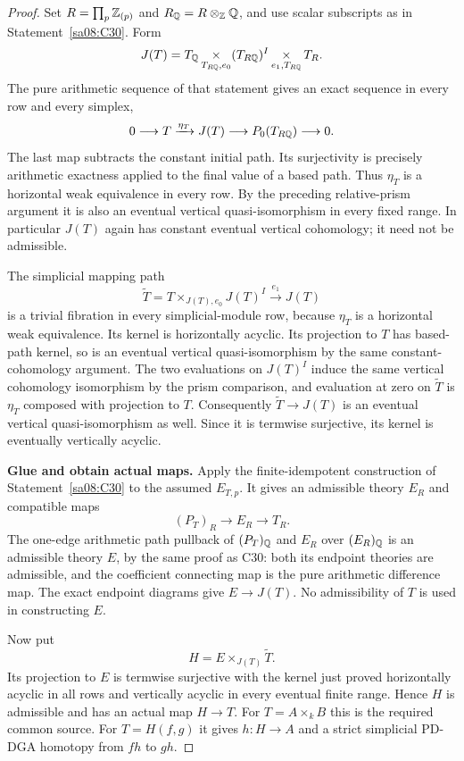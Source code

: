 \begin{proof}
Set $R=\prod_p\mathbb Z_{(p)}$ and $R_\mathbb Q=R\otimes_\mathbb Z\mathbb Q$, and use
scalar subscripts as in Statement~\ref{sa08:C30}. Form
\[
 J(T)=T_\mathbb Q\mathop{\times}_{T_{R\mathbb Q},e_0}
             (T_{R\mathbb Q})^I
           \mathop{\times}_{e_1,T_{R\mathbb Q}}T_R.
\]
The pure arithmetic sequence of that statement gives an exact
sequence in every row and every simplex,
\[
 0\longrightarrow T\xrightarrow{\eta_T}J(T)
       \longrightarrow P_0(T_{R\mathbb Q})\longrightarrow0.
\]
The last map subtracts the constant initial path. Its surjectivity
is precisely arithmetic exactness applied to the final value of a
based path. Thus $\eta_T$ is a horizontal weak equivalence in every
row. By the preceding relative-prism argument it is also an eventual
vertical quasi-isomorphism in every fixed range. In particular
$J(T)$ again has constant eventual vertical cohomology; it need not
be admissible.

The simplicial mapping path
\[
 \widetilde T=T\mathop{\times}_{J(T),e_0}J(T)^I
           \xrightarrow{e_1}J(T)
\]
is a trivial fibration in every simplicial-module row, because
$\eta_T$ is a horizontal weak equivalence. Its kernel is horizontally
acyclic. Its projection to $T$ has based-path kernel, so is an
eventual vertical quasi-isomorphism by the same constant-cohomology
argument. The two evaluations on $J(T)^I$ induce the same vertical
cohomology isomorphism by the prism comparison, and evaluation at zero
on $\widetilde T$ is $\eta_T$ composed with projection to $T$.
Consequently $\widetilde T\to J(T)$ is an eventual
vertical quasi-isomorphism as well. Since it is termwise surjective,
its kernel is eventually vertically acyclic.

\par\medskip\noindent\textbf{Glue and obtain actual maps.}
Apply the finite-idempotent construction of
Statement~\ref{sa08:C30} to the assumed $E_{T,p}$. It gives an
admissible theory $E_R$ and compatible maps
\[
 (P_T)_R\longrightarrow E_R\longrightarrow T_R.
\]
The one-edge arithmetic path pullback of $(P_T)_\mathbb Q$ and $E_R$
over $(E_R)_\mathbb Q$ is an admissible theory $E$, by the same proof as
C30: both its endpoint theories are admissible, and the coefficient
connecting map is the pure arithmetic difference map. The exact
endpoint diagrams give $E\to J(T)$. No admissibility of $T$ is
used in constructing $E$.

Now put
\[
 H=E\times_{J(T)}\widetilde T.
\]
Its projection to $E$ is termwise surjective with the kernel just
proved horizontally acyclic in all rows and vertically acyclic in
every eventual finite range. Hence $H$ is admissible and has an
actual map $H\to T$. For $T=A\times_k B$ this is the required
common source. For $T=H(f,g)$ it gives $h:H\to A$ and a strict
simplicial PD-DGA homotopy from $fh$ to $gh$.


\end{proof}
